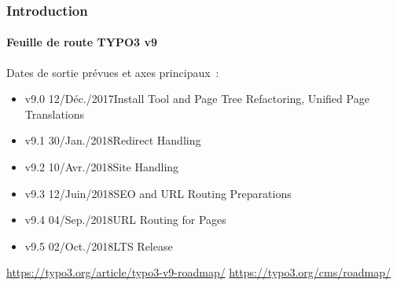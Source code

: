 
\begin{frame}[fragile]
	\frametitle{Introduction}
	\framesubtitle{Feuille de route TYPO3 v9}

	Dates de sortie prévues et axes principaux~:

	\begin{itemize}

		\item v9.0 \tabto{1.1cm}12/Déc./2017\tabto{3.4cm}Install Tool and Page Tree Refactoring,\newline
			\tabto{3.4cm}Unified Page Translations
		\item v9.1 \tabto{1.1cm}30/Jan./2018\tabto{3.4cm}Redirect Handling
		\item v9.2 \tabto{1.1cm}10/Avr./2018\tabto{3.4cm}Site Handling
        \item v9.3 \tabto{1.1cm}12/Juin/2018\tabto{3.4cm}SEO and URL Routing Preparations
		\item
			\begingroup
				\color{typo3orange}
                    v9.4 \tabto{1.1cm}04/Sep./2018\tabto{3.4cm}URL Routing for Pages
			\endgroup
		\item v9.5 \tabto{1.1cm}02/Oct./2018\tabto{3.4cm}LTS Release

	\end{itemize}

	\smaller
		\url{https://typo3.org/article/typo3-v9-roadmap/}\newline
		\url{https://typo3.org/cms/roadmap/}
	\normalsize

\end{frame}


